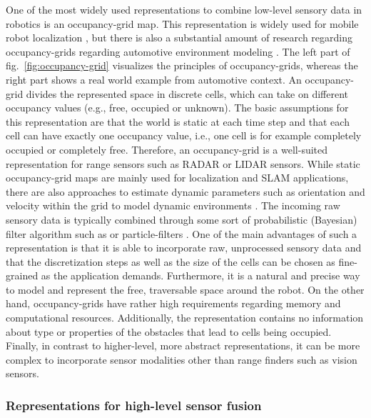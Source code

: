One of the most widely used representations to combine low-level sensory data in robotics is an occupancy-grid map.
This representation is widely used for mobile robot localization \parencite{Thrun2005}, but there is also a substantial amount of research regarding occupancy-grids regarding automotive environment modeling  \parencite{Tanzmeister2014, Steyer2018}.
The left part of fig.~\ref{fig:occupancy-grid} visualizes the principles of occupancy-grids, whereas the right part shows a real world example from automotive context.
An occupancy-grid divides the represented space in discrete cells, which can take on different occupancy values (e.g., free, occupied or unknown).
The basic assumptions for this representation are that the world is static at each time step and that each cell can have exactly one occupancy value, i.e., one cell is for example completely occupied or completely free.
Therefore, an occupancy-grid is a well-suited representation for range sensors such as \ac{RADAR} or \ac{LIDAR} sensors.
While static occupancy-grid maps are mainly used for localization and \ac{SLAM} applications, there are also approaches to estimate dynamic parameters such as orientation and velocity within the grid to model dynamic environments \parencite{Tanzmeister2014}.
The incoming raw sensory data is typically combined through some sort of probabilistic (Bayesian) filter algorithm such as \textcite{Kalman1960} or particle-filters \parencite{Gordon1993}.
One of the main advantages of such a representation is that it is able to incorporate raw, unprocessed sensory data and that the discretization steps as well as the size of the cells can be chosen as fine-grained as the application demands.
Furthermore, it is a natural and precise way to model and represent the free, traversable space around the robot.
On the other hand, occupancy-grids have rather high requirements regarding memory and computational resources.
Additionally, the representation contains no information about type or properties of the obstacles that lead to cells being occupied.
Finally, in contrast to higher-level, more abstract representations, it can be more complex to incorporate sensor modalities other than range finders such as vision sensors.

\subsubsection{Representations for high-level sensor fusion}

